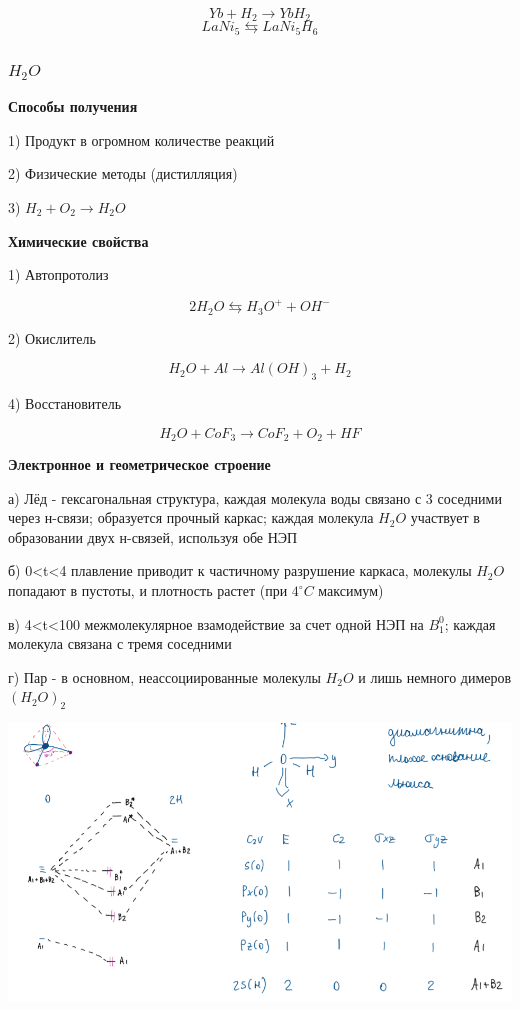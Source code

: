 \documentclass[14pt,a4paper]{scrartcl}
\begin{document}
$$Yb + H_2 \rightarrow YbH_2$$
$$LaNi_5 \leftrightarrows LaNi_5H_6$$

\subsubsection{$H_2O$}

\textbf{Способы получения}

1) Продукт в огромном количестве реакций

2) Физические методы (дистилляция)

3) $H_2 + O_2 \rightarrow H_2O$

\textbf{Химические свойства}

1) Автопротолиз

$$2H_2O \leftrightarrows H_3O^+ + OH^-$$

2) Окислитель

$$H_2O + Al \rightarrow Al(OH)_3 + H_2$$

4) Восстановитель

$$H_2O + CoF_3 \rightarrow CoF_2 + O_2 + HF$$

\textbf{Электронное и геометрическое строение}

а) Лёд - гексагональная структура, каждая молекула воды связано с 3 соседними через н-связи; образуется прочный каркас; каждая молекула $H_2O$ участвует в образовании двух н-связей, используя обе НЭП

б) 0<t<4 плавление приводит к частичному разрушение каркаса, молекулы  $H_2O$ попадают в пустоты, и плотность растет (при $4^{\circ}C$ максимум)

в) 4<t<100 межмолекулярное взамодействие за счет одной НЭП на $B_1^0$; каждая молекула связана с тремя соседними

г) Пар - в основном, неассоциированные молекулы $H_2O$ и лишь немного димеров $(H_2O)_2$

\includegraphics{12v2.png}
\end{document}
